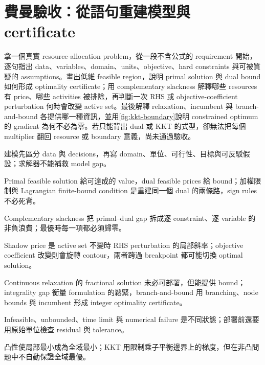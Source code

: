\documentclass[11pt,a4paper,oneside,openany]{book}
\begin{document}
\section{費曼驗收：從語句重建模型與 certificate}
\begin{feynmancheck}
拿一個真實 resource-allocation problem，從一段不含公式的 requirement 開始，逐句指出 data、variables、domain、units、objective、hard constraints 與可被質疑的 assumptions。畫出低維 feasible region，說明 primal solution 與 dual bound 如何形成 optimality certificate；用 complementary slackness 解釋哪些 resources 有 price、哪些 activities 被排除，再判斷一次 RHS 或 objective-coefficient perturbation 何時會改變 active set。最後解釋 relaxation、incumbent 與 branch-and-bound 各提供哪一種資訊，並用\cref{fig:kkt-boundary}說明 constrained optimum 的 gradient 為何不必為零。若只能背出 dual 或 KKT 的式型，卻無法把每個 multiplier 翻回 resource 或 boundary 意義，尚未通過驗收。
\end{feynmancheck}
\begin{chapterrecap}
\item 建模先區分 data 與 decisions，再寫 domain、單位、可行性、目標與可反駁假設；求解器不能補救 model gap。
\item Primal feasible solution 給可達成的 value，dual feasible prices 給 bound；加權限制與 Lagrangian finite-bound condition 是重建同一個 dual 的兩條路，sign rules 不必死背。
\item Complementary slackness 把 primal--dual gap 拆成逐 constraint、逐 variable 的非負浪費；最優時每一項都必須歸零。
\item Shadow price 是 active set 不變時 RHS perturbation 的局部斜率；objective coefficient 改變則會旋轉 contour，兩者跨過 breakpoint 都可能切換 optimal solution。
\item Continuous relaxation 的 fractional solution 未必可部署，但能提供 bound；integrality gap 衡量 formulation 的鬆緊，branch-and-bound 用 branching、node bounds 與 incumbent 形成 integer optimality certificate。
\item Infeasible、unbounded、time limit 與 numerical failure 是不同狀態；部署前還要用原始單位檢查 residual 與 tolerance。
\item 凸性使局部最小成為全域最小；KKT 用限制乘子平衡邊界上的梯度，但在非凸問題中不自動保證全域最優。
\end{chapterrecap}
\end{document}
